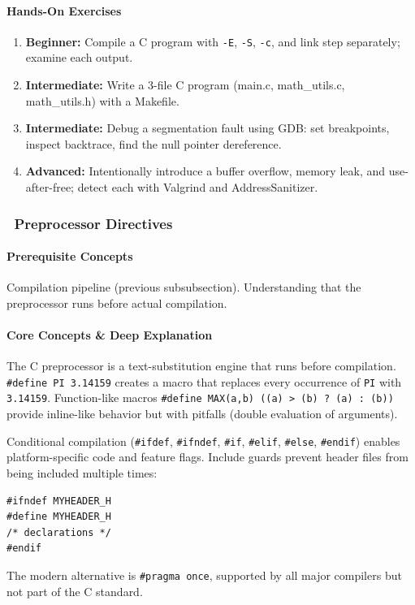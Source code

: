 \documentclass[11pt, a4paper, oneside]{report}
\newcommand{\awareness}[1]{\subsubsection{\texorpdfstring{\fcolorbox{gray!50}{gray!10}{\footnotesize\bfseries\color{gray!50!black} AWARENESS}~#1}{#1}}}
\begin{document}
\paragraph{Hands-On Exercises}
\begin{enumerate}[leftmargin=*]
\item \textbf{Beginner:} Compile a C program with \texttt{-E}, \texttt{-S}, \texttt{-c}, and link step separately; examine each output.
\item \textbf{Intermediate:} Write a 3-file C program (main.c, math\_utils.c, math\_utils.h) with a Makefile.
\item \textbf{Intermediate:} Debug a segmentation fault using GDB: set breakpoints, inspect backtrace, find the null pointer dereference.
\item \textbf{Advanced:} Intentionally introduce a buffer overflow, memory leak, and use-after-free; detect each with Valgrind and AddressSanitizer.
\end{enumerate}

\awareness{Preprocessor Directives}

\paragraph{Prerequisite Concepts} Compilation pipeline (previous subsubsection). Understanding that the preprocessor runs before actual compilation.

\paragraph{Core Concepts \& Deep Explanation} The C preprocessor is a text-substitution engine that runs before compilation. \texttt{\#define PI 3.14159} creates a macro that replaces every occurrence of \texttt{PI} with \texttt{3.14159}. Function-like macros \texttt{\#define MAX(a,b) ((a) > (b) ? (a) : (b))} provide inline-like behavior but with pitfalls (double evaluation of arguments).

Conditional compilation (\texttt{\#ifdef}, \texttt{\#ifndef}, \texttt{\#if}, \texttt{\#elif}, \texttt{\#else}, \texttt{\#endif}) enables platform-specific code and feature flags. Include guards prevent header files from being included multiple times:

\begin{verbatim}
#ifndef MYHEADER_H
#define MYHEADER_H
/* declarations */
#endif
\end{verbatim}

The modern alternative is \texttt{\#pragma once}, supported by all major compilers but not part of the C standard.
\end{document}
